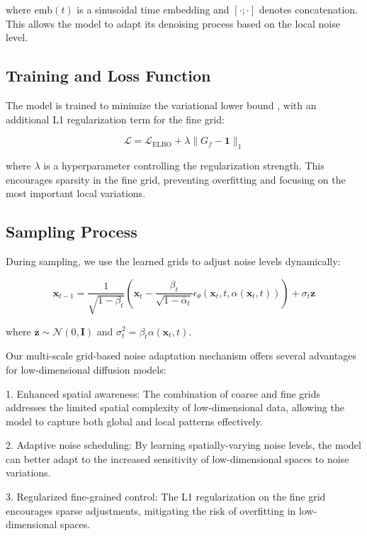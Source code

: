 \documentclass{article} %
\begin{document}
where $\text{emb}(t)$ is a sinusoidal time embedding and $[\cdot;\cdot]$ denotes concatenation. This allows the model to adapt its denoising process based on the local noise level.

\subsection{Training and Loss Function}

The model is trained to minimize the variational lower bound \cite{ddpm}, with an additional L1 regularization term for the fine grid:

\begin{equation}
    \mathcal{L} = \mathcal{L}_\text{ELBO} + \lambda \|G_f - \mathbf{1}\|_1
\end{equation}

where $\lambda$ is a hyperparameter controlling the regularization strength. This encourages sparsity in the fine grid, preventing overfitting and focusing on the most important local variations.

\subsection{Sampling Process}

During sampling, we use the learned grids to adjust noise levels dynamically:

\begin{equation}
    \mathbf{x}_{t-1} = \frac{1}{\sqrt{1 - \beta_t}}(\mathbf{x}_t - \frac{\beta_t}{\sqrt{1 - \bar{\alpha}_t}}\epsilon_\theta(\mathbf{x}_t, t, \alpha(\mathbf{x}_t, t))) + \sigma_t\mathbf{z}
\end{equation}

where $\mathbf{z} \sim \mathcal{N}(0, \mathbf{I})$ and $\sigma_t^2 = \beta_t\alpha(\mathbf{x}_t, t)$.

Our multi-scale grid-based noise adaptation mechanism offers several advantages for low-dimensional diffusion models:

1. Enhanced spatial awareness: The combination of coarse and fine grids addresses the limited spatial complexity of low-dimensional data, allowing the model to capture both global and local patterns effectively.

2. Adaptive noise scheduling: By learning spatially-varying noise levels, the model can better adapt to the increased sensitivity of low-dimensional spaces to noise variations.

3. Regularized fine-grained control: The L1 regularization on the fine grid encourages sparse adjustments, mitigating the risk of overfitting in low-dimensional spaces.
\end{document}
